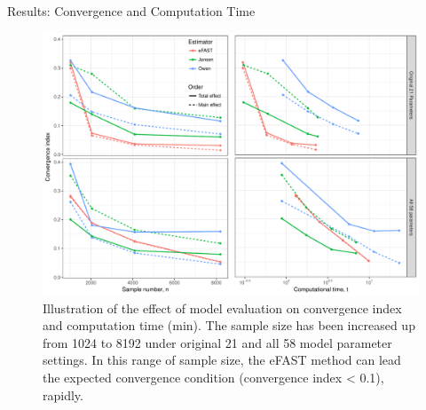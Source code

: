 \documentclass[xcolor=table]{beamer}
\begin{document}
\begin{frame}[t]
\begin{columns}[t]
\begin{column}{0.23\paperwidth}
\begin{block}{Results: Convergence and Computation Time}
\begin{figure}
\includegraphics[width=0.98\linewidth]{fig2.pdf}
\caption{Illustration of the effect of model evaluation on convergence index and computation time (min).
The sample size has been increased up from 1024 to 8192 under original 21 and all 58 model parameter settings.
In this range of sample size, the eFAST method can lead the expected convergence condition (convergence index < 0.1), rapidly.
}
\end{figure}
\end{block}



\end{column}
\end{columns}
\end{frame}
\end{document}
